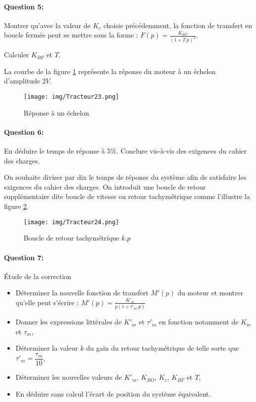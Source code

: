 \paragraph{Question 5:} Montrer qu'avec la valeur de $K_c$ choisie précédemment, la fonction de transfert en boucle fermée peut se mettre sous la forme : $F(p)=\frac{K_{BF}}{(1+T.p)^2}$,

Calculer $K_{BF}$ et $T$.

La courbe de la figure \ref{fig23} représente la réponse du moteur à un échelon d'amplitude $2V$.

\begin{figure}[!h]
\centering\texttt{[image: img/Tracteur23.png]}
\caption{Réponse à un échelon}
\label{fig23}
\end{figure}

\paragraph{Question 6:} En déduire le temps de réponse à 5\%. Conclure vis-à-vis des exigences du
cahier des charges.

On souhaite diviser par dix le temps de réponse du système afin de satisfaire les exigences du cahier des charges. On introduit une boucle de retour supplémentaire dite boucle de vitesse ou retour tachymétrique comme l'illustre la figure \ref{fig24}.

\begin{figure}[!h]
\centering\texttt{[image: img/Tracteur24.png]}
\caption{Boucle de retour tachymétrique $k.p$}
\label{fig24}
\end{figure}

\paragraph{Question 7:} Étude de la correction

\begin{itemize}
 \item Déterminer la nouvelle fonction de transfert $M'(p)$ du moteur et montrer qu'elle peut s'écrire : $M'(p)=\frac{K'_m}{p(1+\tau'_m.p)}$

 \item Donner les expressions littérales de $K'_m$ et $\tau'_m$ en fonction notamment de $K_m$ et $\tau_m$,
 \item Déterminer la valeur $k$ du gain du retour tachymétrique de telle sorte que $\tau'_m=\dfrac{\tau_m}{10}$,
 \item Déterminer les nouvelles valeurs de $K'_m$, $K_{BO}$, $K_c$, $K_{BF}$ et $T$,
 \item En déduire sans calcul l'écart de position du système équivalent.
\end{itemize}

